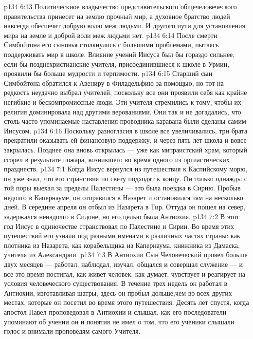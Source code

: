 \vs p134 6:13 Политическиое владычество представительского общечеловеческого правительства принесет на землю прочный мир, а духовное братство людей навсегда обеспечит добрую волю меж людьми. И другого пути для установления мира на земле и доброй воли меж людьми нет.
\separatorline
\vs p134 6:14 После смерти Симбойтона его сыновья столкнулись с большими проблемами, пытаясь поддерживать мир в школе. Влияние учений Иисуса был бы гораздо сильнее, если бы позднехристианские учителя, присоединившиеся к школе в Урмии, проявили бы больше мудрости и терпимости.
\vs p134 6:15 Старший сын Симбойтона обратился к Авениру в Филадельфию за помощью, но тот на редкость неудачно выбрал учителей, поскольку все они проявили себя как крайне негибкие и бескомпромиссные люди. Эти учителя стремились к тому, чтобы их религия доминировала над другими верованиями. Они так и не догадались, что столь часто упоминаемые наставления проводника каравана были сделаны самим Иисусом.
\vs p134 6:16 Поскольку разногласия в школе все увеличивались, три брата прекратили оказывать ей финансовую поддержку, и через пять лет школа и вовсе закрылась. Позднее она вновь открылась --- уже как митраистский храм, который сгорел в результате пожара, возникшего во время одного из оргиастических празднеств.
\vs p134 7:1 Когда Иисус вернулся из путешествия к Каспийскому морю, он уже знал, что его странствия по свету подходят к концу. Он только однажды с той поры выехал за пределы Палестины --- это была поездка в Сирию. Пробыв недолго в Капернауме, он отправился в Назарет и остановился там на несколько дней. В середине апреля он отбыл из Назарета в Тир. Оттуда он пошел на север, задержался ненадолго в Сидоне, но его целью была Антиохия.
\vs p134 7:2 В этот год Иисус в одиночестве странствовал по Палестине и Сирии. Во время этих путешествий его узнали под разными именами в различных частях страны: как плотника из Назарета, как корабельщика из Капернаума, книжника из Дамаска, учителя из Александрии.
\vs p134 7:3 В Антиохии Сын Человеческий провел больше двух месяцев --- работал, наблюдал, изучал, общался и совершал служение --- и все это время постигал, как живет человек, как думает, чувствует и реагирует на условия человеческого существования. В течение трех недель он работал в Антиохии, изготавливая шатры; здесь он пробыл дольше,чем во всех других местах, которые он посетил во время этого путешествия. Десять лет спустя, когда апостол Павел проповедовал в Антиохии и слышал, как его последователи упоминают об учении  он и понятия не имел о том, что его ученики слышали голос и внимали проповедям самого Учителя.
